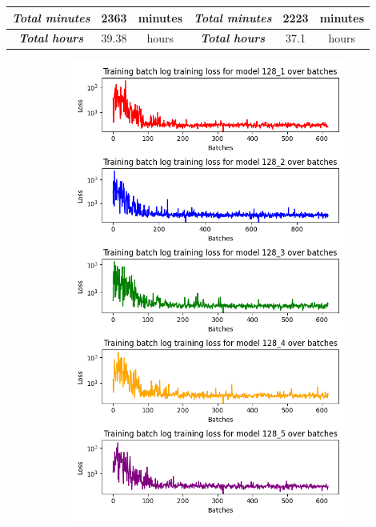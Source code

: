 \begin{table}[H]
\begin{tabular}{|cccccl|}
        \multicolumn{1}{|c|}{\textit{\textbf{Total minutes}}} & \multicolumn{1}{c|}{2363}           & \multicolumn{1}{c|}{minutes}       & \multicolumn{1}{c|}{\textit{\textbf{Total minutes}}} & \multicolumn{1}{c|}{2223}           & \multicolumn{1}{c|}{minutes}       \\ \hline
        \multicolumn{1}{|c|}{\textit{\textbf{Total hours}}}   & \multicolumn{1}{c|}{39.38}          & \multicolumn{1}{c|}{hours}         & \multicolumn{1}{c|}{\textit{\textbf{Total hours}}}   & \multicolumn{1}{c|}{37.1}           & \multicolumn{1}{c|}{hours}         \\ \hline
        \end{tabular}
        \end{table}


\begin{figure}[H]
    \caption{Plots of training loss for individual models in the ensembles of 64-state- and 128-state- representations.}
    \begin{subfigure}{0.5\textwidth}
        \centering
        \includegraphics[width=0.95\linewidth]{Images/Results/Training_loss_128.png}

\end{subfigure}
\end{figure}
